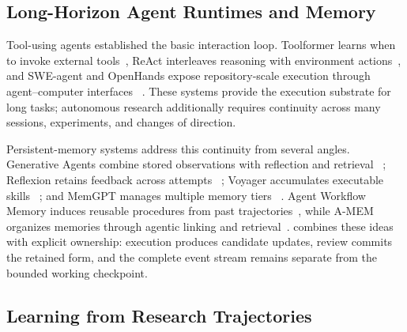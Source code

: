 \subsection{Long-Horizon Agent Runtimes and Memory}

Tool-using agents established the basic interaction loop. Toolformer learns when to
invoke external tools~\citep{schick2023toolformer}, ReAct interleaves reasoning with
environment actions~\citep{yao2023react}, and SWE-agent and OpenHands expose
repository-scale execution through agent--computer interfaces
~\citep{yang2024sweagent,wang2024openhands}. These systems provide the execution
substrate for long tasks; autonomous research additionally requires continuity
across many sessions, experiments, and changes of direction.

Persistent-memory systems address this continuity from several angles. Generative
Agents combine stored observations with reflection and retrieval
~\citep{park2023generative}; Reflexion retains feedback across attempts
~\citep{shinn2023reflexion}; Voyager accumulates executable skills
~\citep{wang2023voyager}; and MemGPT manages multiple memory tiers
~\citep{packer2023memgpt}. Agent Workflow Memory induces reusable procedures from
past trajectories~\citep{wang2024workflowmemory}, while A-MEM organizes memories
through agentic linking and retrieval~\citep{xu2025amem}. \systemname combines
these ideas with explicit ownership: execution produces candidate updates, review
commits the retained form, and the complete event stream remains separate from the
bounded working checkpoint.

\subsection{Learning from Research Trajectories}

